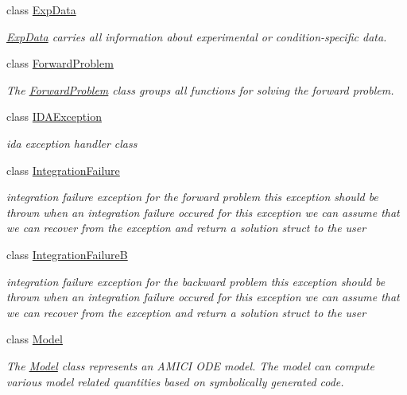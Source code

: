 \begin{DoxyCompactItemize}
class \mbox{\hyperlink{classamici_1_1_exp_data}{Exp\+Data}}
\begin{DoxyCompactList}\small\item\em \mbox{\hyperlink{classamici_1_1_exp_data}{Exp\+Data}} carries all information about experimental or condition-\/specific data. \end{DoxyCompactList}\item 
class \mbox{\hyperlink{classamici_1_1_forward_problem}{Forward\+Problem}}
\begin{DoxyCompactList}\small\item\em The \mbox{\hyperlink{classamici_1_1_forward_problem}{Forward\+Problem}} class groups all functions for solving the forward problem. \end{DoxyCompactList}\item 
class \mbox{\hyperlink{classamici_1_1_i_d_a_exception}{I\+D\+A\+Exception}}
\begin{DoxyCompactList}\small\item\em ida exception handler class \end{DoxyCompactList}\item 
class \mbox{\hyperlink{classamici_1_1_integration_failure}{Integration\+Failure}}
\begin{DoxyCompactList}\small\item\em integration failure exception for the forward problem this exception should be thrown when an integration failure occured for this exception we can assume that we can recover from the exception and return a solution struct to the user \end{DoxyCompactList}\item 
class \mbox{\hyperlink{classamici_1_1_integration_failure_b}{Integration\+FailureB}}
\begin{DoxyCompactList}\small\item\em integration failure exception for the backward problem this exception should be thrown when an integration failure occured for this exception we can assume that we can recover from the exception and return a solution struct to the user \end{DoxyCompactList}\item 
class \mbox{\hyperlink{classamici_1_1_model}{Model}}
\begin{DoxyCompactList}\small\item\em The \mbox{\hyperlink{classamici_1_1_model}{Model}} class represents an A\+M\+I\+CI O\+DE model. The model can compute various model related quantities based on symbolically generated code. \end{DoxyCompactList}\item 

\end{DoxyCompactItemize}
